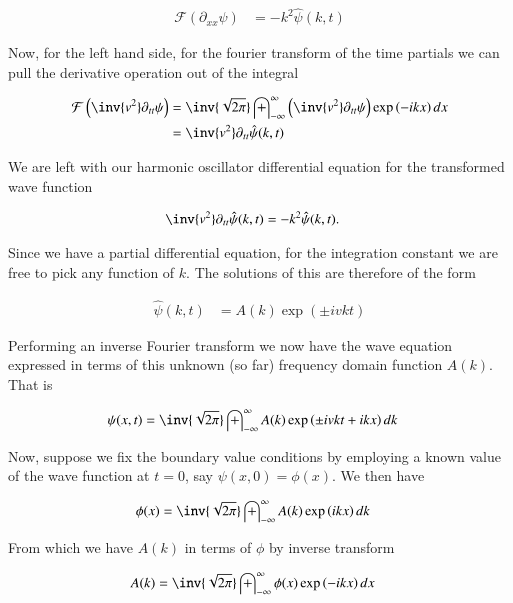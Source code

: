 \documentclass{article}
\newcommand{\FF}[0]{\mathcal{F}}
\newcommand{\IIinf}[0]{ \int_{-\infty}^\infty }
\begin{document}
\begin{align*}
\FF\left( \partial_{xx} \psi \right) &= -k^2 \hat{\psi}(k, t)
\end{align*}

Now, for the left hand side, for the fourier transform of the time partials we can pull the derivative operation out of the 
integral

\begin{align*}
\FF\left( \inv{v^2} \partial_{tt} \psi \right) 
&= \inv{\sqrt{2 \pi}} \IIinf \left( \inv{v^2} \partial_{tt} \psi \right) \exp\left( -i k x \right) dx \\
&= \inv{v^2} \partial_{tt} \hat{\psi}(k,t) \\
\end{align*}

We are left with our harmonic oscillator differential equation for the transformed wave function

\begin{align*}
\inv{v^2} \partial_{tt} \hat{\psi}(k,t) &= -k^2 \hat{\psi}(k, t).
\end{align*}

Since we have a partial differential equation, for the integration constant we are free to pick any function of $k$.  The solutions of this are therefore of the form

\begin{align*}
\hat{\psi}(k,t) &= A(k) \exp\left( \pm i v k t \right)
\end{align*}

Performing an inverse Fourier transform we now have the wave equation expressed in terms of this unknown (so far) frequency domain function $A(k)$.  That is

\begin{align}\label{eqn:almostThere}
{\psi}(x,t) &= \inv{\sqrt{2\pi}} \IIinf A(k) \exp\left( \pm i v k t + i k x \right) dk
\end{align}

Now, suppose we fix the boundary value conditions by employing a known value of the wave function at $t = 0$, say $\psi(x,0) = \phi(x)$.  We then have

\begin{align*}
{\phi}(x) &= \inv{\sqrt{2\pi}} \IIinf A(k) \exp\left( i k x \right) dk
\end{align*}

From which we have $A(k)$ in terms of $\phi$ by inverse transform

\begin{align}\label{eqn:freqInitial}
A(k) &= \inv{\sqrt{2\pi}} \IIinf \phi(x) \exp\left( -i k x \right) dx
\end{align}
\end{document}
